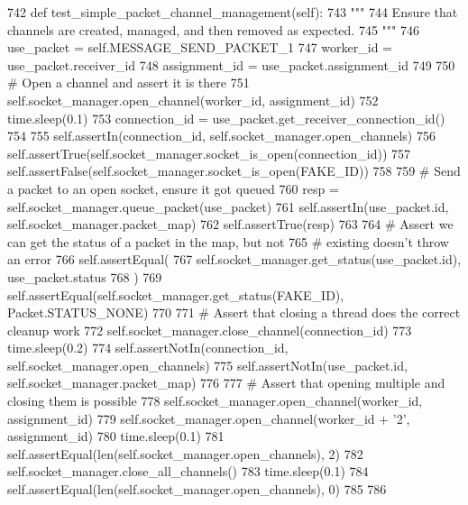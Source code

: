 \begin{DoxyCode}
742     \textcolor{keyword}{def }test\_simple\_packet\_channel\_management(self):
743         \textcolor{stringliteral}{"""}
744 \textcolor{stringliteral}{        Ensure that channels are created, managed, and then removed as expected.}
745 \textcolor{stringliteral}{        """}
746         use\_packet = self.MESSAGE\_SEND\_PACKET\_1
747         worker\_id = use\_packet.receiver\_id
748         assignment\_id = use\_packet.assignment\_id
749 
750         \textcolor{comment}{# Open a channel and assert it is there}
751         self.socket\_manager.open\_channel(worker\_id, assignment\_id)
752         time.sleep(0.1)
753         connection\_id = use\_packet.get\_receiver\_connection\_id()
754 
755         self.assertIn(connection\_id, self.socket\_manager.open\_channels)
756         self.assertTrue(self.socket\_manager.socket\_is\_open(connection\_id))
757         self.assertFalse(self.socket\_manager.socket\_is\_open(FAKE\_ID))
758 
759         \textcolor{comment}{# Send a packet to an open socket, ensure it got queued}
760         resp = self.socket\_manager.queue\_packet(use\_packet)
761         self.assertIn(use\_packet.id, self.socket\_manager.packet\_map)
762         self.assertTrue(resp)
763 
764         \textcolor{comment}{# Assert we can get the status of a packet in the map, but not}
765         \textcolor{comment}{# existing doesn't throw an error}
766         self.assertEqual(
767             self.socket\_manager.get\_status(use\_packet.id), use\_packet.status
768         )
769         self.assertEqual(self.socket\_manager.get\_status(FAKE\_ID), Packet.STATUS\_NONE)
770 
771         \textcolor{comment}{# Assert that closing a thread does the correct cleanup work}
772         self.socket\_manager.close\_channel(connection\_id)
773         time.sleep(0.2)
774         self.assertNotIn(connection\_id, self.socket\_manager.open\_channels)
775         self.assertNotIn(use\_packet.id, self.socket\_manager.packet\_map)
776 
777         \textcolor{comment}{# Assert that opening multiple and closing them is possible}
778         self.socket\_manager.open\_channel(worker\_id, assignment\_id)
779         self.socket\_manager.open\_channel(worker\_id + \textcolor{stringliteral}{'2'}, assignment\_id)
780         time.sleep(0.1)
781         self.assertEqual(len(self.socket\_manager.open\_channels), 2)
782         self.socket\_manager.close\_all\_channels()
783         time.sleep(0.1)
784         self.assertEqual(len(self.socket\_manager.open\_channels), 0)
785 
786 
\end{DoxyCode}


